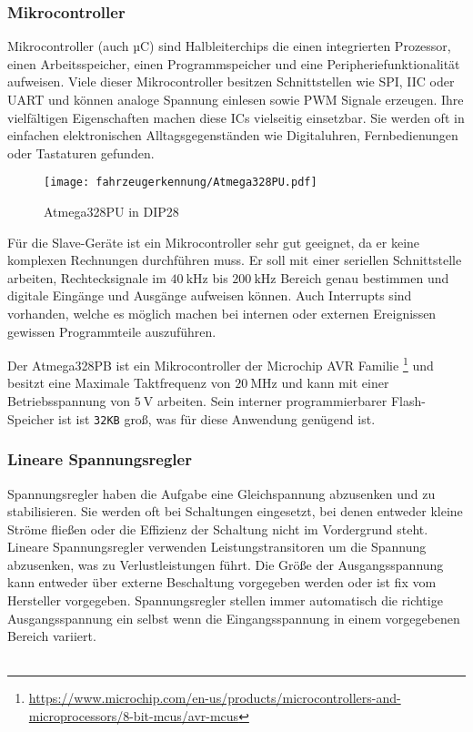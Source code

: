 \subsubsection{Mikrocontroller}

Mikrocontroller (auch µC) sind Halbleiterchips die einen integrierten Prozessor, einen Arbeitsspeicher, einen Programmspeicher und eine Peripheriefunktionalität aufweisen. Viele dieser Mikrocontroller besitzen Schnittstellen wie SPI, IIC oder UART
und können analoge Spannung einlesen sowie PWM Signale erzeugen. Ihre vielfältigen Eigenschaften machen diese ICs vielseitig einsetzbar. Sie werden oft in einfachen elektronischen Alltagsgegenständen wie Digitaluhren, Fernbedienungen oder Tastaturen gefunden. 

\begin{figure}[H]
    \centering
    \texttt{[image: fahrzeugerkennung/Atmega328PU.pdf]}
    \caption{Atmega328PU in DIP28}
\end{figure}

Für die Slave-Geräte ist ein Mikrocontroller sehr gut geeignet, da er keine komplexen Rechnungen durchführen muss. Er soll mit einer seriellen Schnittstelle arbeiten, Rechtecksignale im $\SI{40}{\kilo\hertz}$ bis $\SI{200}{\kilo\hertz}$ Bereich genau bestimmen und
digitale Eingänge und Ausgänge aufweisen können. Auch Interrupts sind vorhanden, welche es möglich machen bei internen oder externen Ereignissen gewissen Programmteile auszuführen.



Der Atmega328PB ist ein Mikrocontroller der Microchip AVR Familie \footnote{\url{https://www.microchip.com/en-us/products/microcontrollers-and-microprocessors/8-bit-mcus/avr-mcus}} und besitzt eine Maximale Taktfrequenz von $\SI{20}{\mega\hertz}$ und kann mit einer Betriebsspannung von $\SI{5}{\volt}$ arbeiten.
Sein interner programmierbarer Flash-Speicher ist ist \texttt{32KB} groß, was für diese Anwendung genügend ist.

\subsubsection{Lineare Spannungsregler}

Spannungsregler haben die Aufgabe eine Gleichspannung abzusenken und zu stabilisieren. Sie werden oft bei Schaltungen eingesetzt, bei denen entweder kleine Ströme fließen oder die Effizienz der Schaltung nicht im Vordergrund steht.
Lineare Spannungsregler verwenden Leistungstransitoren um die Spannung abzusenken, was zu Verlustleistungen führt. Die Größe der Ausgangsspannung kann entweder über externe Beschaltung vorgegeben werden oder ist fix vom Hersteller vorgegeben. Spannungsregler stellen 
immer automatisch die richtige Ausgangsspannung ein selbst wenn die Eingangsspannung in einem vorgegebenen Bereich variiert. 
\\ \\

